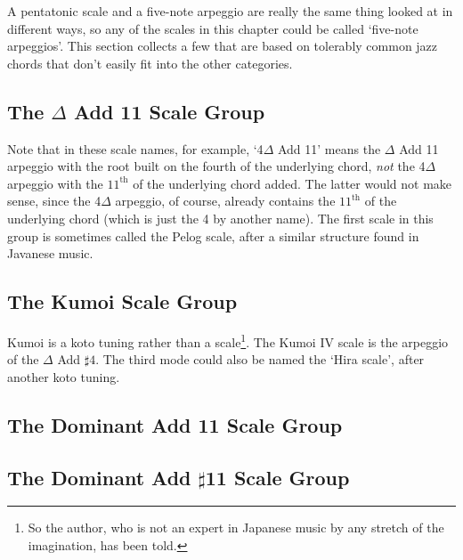 \documentclass[english]{./gbook}
\begin{document}
\begin{large}
A pentatonic scale and a five-note arpeggio are really the same thing looked at in different ways, so any of the scales in this chapter could be called `five-note arpeggios'. This section collects a few that are based on tolerably common jazz chords that don't easily fit into the other categories.

\subsection{The $\Delta$ Add 11 Scale Group}

Note that in these scale names, for example, `4$\Delta$ Add 11' means the $\Delta$ Add 11 arpeggio with the root built on the fourth of the underlying chord, \emph{not} the 4$\Delta$ arpeggio with the $11^{\text{th}}$ of the underlying chord added. The latter would not make sense, since the 4$\Delta$ arpeggio, of course, already contains the $11^{\text{th}}$ of the underlying chord (which is just the 4 by another name). The first scale in this group is sometimes called the Pelog scale, after a similar structure found in Javanese music.


\subsection{The Kumoi Scale Group}
Kumoi is a koto tuning rather than a scale\footnote{So the author, who is not an expert in Japanese music by any stretch of the imagination, has been told.}. The Kumoi IV scale is the arpeggio of the $\Delta$ Add $\sharp4$. The third mode could also be named the `Hira scale', after another koto tuning.

\subsection{The Dominant Add 11 Scale Group}

\subsection{The Dominant Add $\sharp$11 Scale Group}


\end{large}
\end{document}
